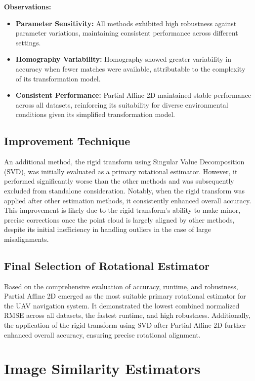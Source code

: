 \textbf{Observations:}  
\begin{itemize}
    \item \textbf{Parameter Sensitivity:} All methods exhibited high robustness against parameter variations, maintaining consistent performance across different settings.
    \item \textbf{Homography Variability:} Homography showed greater variability in accuracy when fewer matches were available, attributable to the complexity of its transformation model.
    \item \textbf{Consistent Performance:} Partial Affine 2D maintained stable performance across all datasets, reinforcing its suitability for diverse environmental conditions given its simplified transformation model.
\end{itemize}

\subsection{Improvement Technique}

An additional method, the rigid transform using Singular Value Decomposition (SVD), was initially evaluated as a primary rotational estimator. However, it performed significantly worse than the other methods and was subsequently excluded from standalone consideration. Notably, when the rigid transform was applied after other estimation methods, it consistently enhanced overall accuracy. This improvement is likely due to the rigid transform's ability to make minor, precise corrections once the point cloud is largely aligned by other methods, despite its initial inefficiency in handling outliers in the case of large misalignments.

\subsection{Final Selection of Rotational Estimator}

Based on the comprehensive evaluation of accuracy, runtime, and robustness, Partial Affine 2D emerged as the most suitable primary rotational estimator for the UAV navigation system. It demonstrated the lowest combined normalized RMSE across all datasets, the fastest runtime, and high robustness. Additionally, the application of the rigid transform using SVD after Partial Affine 2D further enhanced overall accuracy, ensuring precise rotational alignment.

\section{Image Similarity Estimators}

